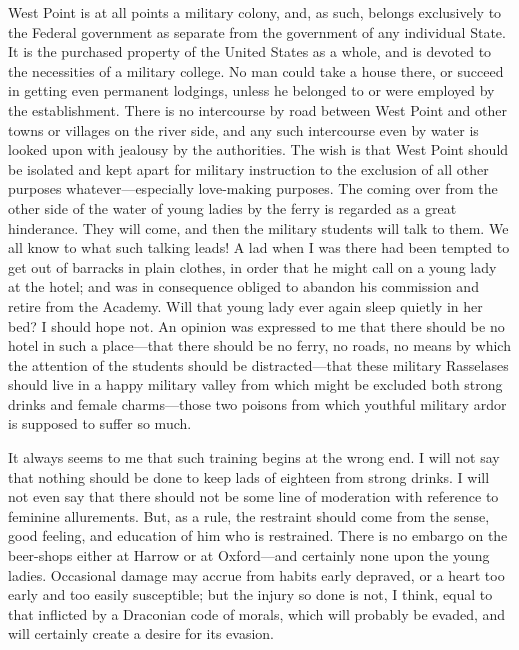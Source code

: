 West Point is at all points a military colony, and, as such,
belongs exclusively to the Federal government as separate from the
government of any individual State.  It is the purchased property
of the United States as a whole, and is devoted to the necessities
of a military college.  No man could take a house there, or succeed
in getting even permanent lodgings, unless he belonged to or were
employed by the establishment.  There is no intercourse by road
between West Point and other towns or villages on the river side,
and any such intercourse even by water is looked upon with jealousy
by the authorities.  The wish is that West Point should be isolated
and kept apart for military instruction to the exclusion of all
other purposes whatever---especially love-making purposes.  The
coming over from the other side of the water of young ladies by the
ferry is regarded as a great hinderance.  They will come, and then
the military students will talk to them.  We all know to what such
talking leads!  A lad when I was there had been tempted to get out
of barracks in plain clothes, in order that he might call on a
young lady at the hotel; and was in consequence obliged to abandon
his commission and retire from the Academy.  Will that young lady
ever again sleep quietly in her bed?  I should hope not.  An
opinion was expressed to me that there should be no hotel in such a
place---that there should be no ferry, no roads, no means by which
the attention of the students should be distracted---that these
military Rasselases should live in a happy military valley from
which might be excluded both strong drinks and female charms---those
two poisons from which youthful military ardor is supposed to
suffer so much.

It always seems to me that such training begins at the wrong end.
I will not say that nothing should be done to keep lads of eighteen
from strong drinks.  I will not even say that there should not be
some line of moderation with reference to feminine allurements.
But, as a rule, the restraint should come from the sense, good
feeling, and education of him who is restrained.  There is no
embargo on the beer-shops either at Harrow or at Oxford---and
certainly none upon the young ladies.  Occasional damage may accrue
from habits early depraved, or a heart too early and too easily
susceptible; but the injury so done is not, I think, equal to that
inflicted by a Draconian code of morals, which will probably be
evaded, and will certainly create a desire for its evasion.

